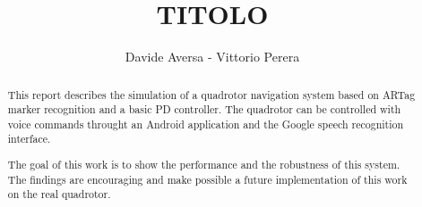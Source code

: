 \documentclass[a4paper,10pt]{article}
\title{TITOLO}
\author{Davide Aversa - Vittorio Perera}
\begin{document}
\maketitle

\begin{abstract}

This report describes the simulation of a quadrotor navigation system based on
ARTag marker recognition and a basic PD controller. The quadrotor can be
controlled with voice commands throught an Android application and the Google
speech recognition interface.

The goal of this work is to show the performance and the robustness of this
system. The findings are encouraging and make possible a future implementation
of this work on the real quadrotor.

\end{abstract}
















\end{document}
